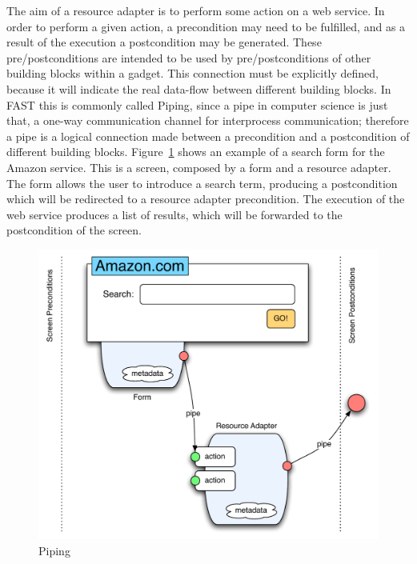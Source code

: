 \documentclass{fast_latex}
\begin{document}
The aim of a resource adapter is to perform some action on a web service. In order to perform a given action, a precondition may need to be fulfilled, and as a result of the execution a postcondition may be generated. These pre/postconditions are intended to be used by pre/postconditions of other building blocks within a gadget. This connection must be explicitly defined, because it will indicate the real data-flow between different building blocks. In FAST this is commonly called Piping, since a pipe in computer science is just that, a one-way communication channel for interprocess communication; therefore a pipe is a logical connection made between a precondition and a postcondition of different building blocks. Figure~\ref{fig:Piping} shows an example of a search form for the Amazon service. This is a screen, composed by a form and a resource adapter. The form allows the user to introduce a search term, producing a postcondition which will be redirected to a resource adapter precondition. The execution of the web service produces a list of results, which will be forwarded to the postcondition of the screen.

\begin{figure}[!htb]
  \begin{center}
    \includegraphics[width=12cm]{images/piping.pdf}
    \caption{Piping}
    \label{fig:Piping}
  \end{center}
\end{figure}


\end{document}

